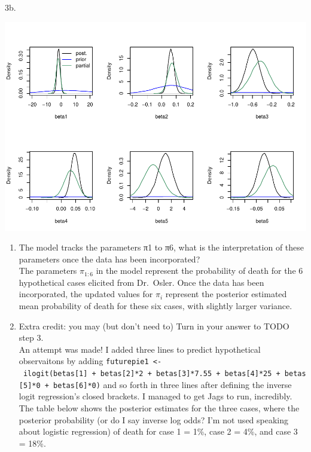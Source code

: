 \documentclass[
]{article}
\begin{document}
3b.

\includegraphics{Lab-3-Markdown_files/figure-latex/unnamed-chunk-7-1.pdf}

\begin{enumerate}
\def\labelenumi{\arabic{enumi}.}
\setcounter{enumi}{3}
\item
  The model tracks the parameters π1 to π6, what is the interpretation
  of these parameters once the data has been incorporated?\\
  The parameters \(\pi_{1:6}\) in the model represent the probability of
  death for the 6 hypothetical cases elicited from Dr.~Osler. Once the
  data has been incorporated, the updated values for \(\pi_i\) represent
  the posterior estimated mean probability of death for these six cases,
  with slightly larger variance.
\item
  Extra credit: you may (but don't need to) Turn in your answer to TODO
  step 3.\\
  An attempt was made! I added three lines to predict hypothetical
  observaitons by adding
  \texttt{futurepie1\ \textless{}-\ ilogit(betas{[}1{]}\ +\ betas{[}2{]}*2\ +\ betas{[}3{]}*7.55\ +\ betas{[}4{]}*25\ +\ betas{[}5{]}*0\ +\ betas{[}6{]}*0)}
  and so forth in three lines after defining the inverse logit
  regression's closed brackets. I managed to get Jags to run,
  incredibly.\\
  The table below shows the posterior estimates for the three cases,
  where the posterior probability (or do I say inverse log odds? I'm not
  used speaking about logistic regression) of death for case 1 = 1\%,
  case 2 = 4\%, and case 3 = 18\%.
\end{enumerate}
\end{document}
